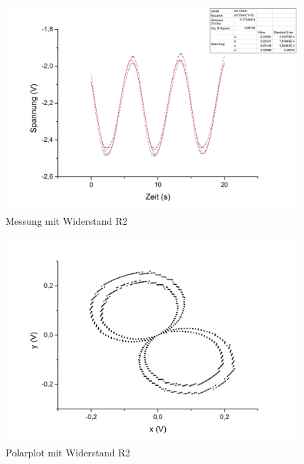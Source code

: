 \begin{figure}[h]
\begin{center}
\includegraphics[scale=0.6]{Bilder/w2}
\caption{Messung mit Widerstand R2}
\end{center}
\end{figure}
\begin{figure}[h]
\begin{center}
\includegraphics[scale=0.6]{Bilder/pw2}
\caption{Polarplot mit Widerstand R2}
\end{center}
\end{figure}

